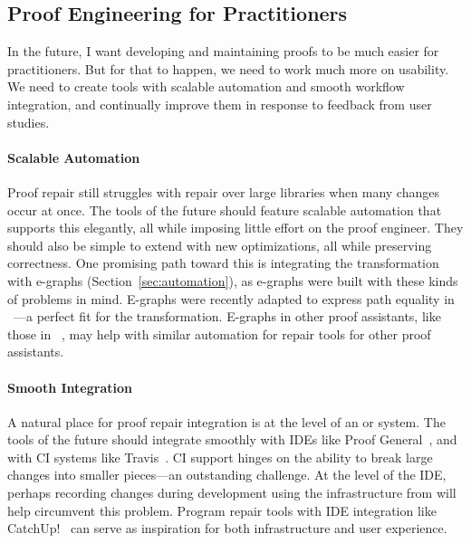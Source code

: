 \subsection*{Proof Engineering for Practitioners}

In the future, I want developing and maintaining proofs to be much easier for practitioners.
But for that to happen, we need to work much more on usability.
We need to create tools with scalable automation and smooth workflow integration,
and continually improve them in response to feedback from user studies.

\paragraph{Scalable Automation}
Proof repair still struggles with repair over large libraries when many changes occur at once.
The tools of the future should feature scalable automation that supports this elegantly,
all while imposing little effort on the proof engineer.
They should also be simple to extend with new optimizations, all while preserving correctness.
One promising path toward this is integrating the \toolnamec transformation with e-graphs (Section~\ref{sec:automation}),
as e-graphs were built with these kinds of problems in mind.
E-graphs were recently adapted to express path equality in ~\cite{egraph6}---a perfect fit for the \toolnamec transformation.
E-graphs in other proof assistants, like those in ~\cite{selsam:lean}, may help with similar automation for repair tools for other proof assistants.

\paragraph{Smooth Integration}
A natural place for proof repair integration is at the level of an  or  system.
The tools of the future should integrate smoothly with IDEs like Proof General~\cite{proofgeneral},
and with CI systems like Travis~\cite{travis}.
CI support hinges on the ability to break large changes into smaller pieces---an outstanding challenge.
At the level of the IDE, perhaps recording changes during development using the infrastructure from
 will help circumvent this problem.
Program repair tools with IDE integration like CatchUp!~\cite{Henkel:2005:CCR:1062455.1062512} can
serve as inspiration for both infrastructure and user experience.

